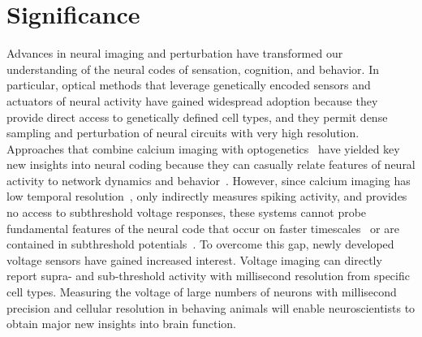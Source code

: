 \section{Significance}

Advances in neural imaging and perturbation have transformed our understanding of the neural
codes of sensation, cognition, and behavior. In particular, optical methods that leverage genetically encoded
sensors and actuators of neural activity have gained widespread adoption because they provide direct access
to genetically defined cell types, and they permit dense sampling and perturbation of neural circuits with very
high resolution. Approaches that combine  calcium imaging with  optogenetics~\cite{packer2014simultaneous,mardinly2018precise,yang2018simultaneous,rickgauer2014simultaneous,paluch2015all}
have yielded key new insights into neural coding because they can casually relate features of neural activity to network dynamics and behavior~\cite{marshel2019cortical,carrillo2019controlling,robinson2020targeted,daie2021targeted,carrillo2016imprinting,gill2020precise,forli2018two}. However, since calcium imaging has low temporal
resolution~\cite{chen2013ultrasensitive}, only indirectly measures spiking activity, and provides no access to subthreshold voltage
responses, these systems cannot probe fundamental features of the neural code that occur on faster timescales~\cite{gollisch2008rapid,butts2007temporal,berry1997structure,diesmann1999stable} or are contained in subthreshold potentials~\cite{sachidhanandam2013membrane,adesnik2017synaptic}. To overcome this  gap, newly developed voltage sensors have gained increased interest.
Voltage imaging
can directly report supra- and sub-threshold activity with millisecond resolution from specific cell types. 
Measuring the voltage of large numbers of
neurons with millisecond precision and cellular resolution in behaving animals  will enable neuroscientists to obtain major new insights into brain function.


